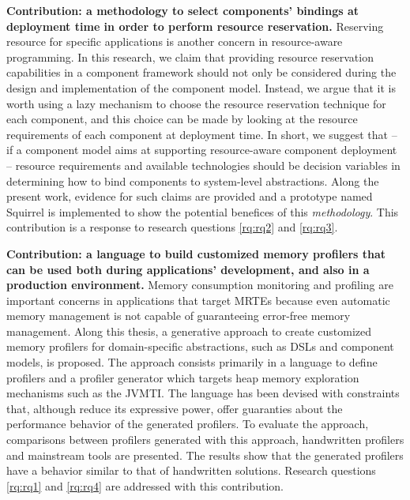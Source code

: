\textbf{Contribution: a methodology to select components' bindings at deployment time in order to perform resource reservation.}
Reserving resource for specific applications is another concern in resource-aware programming.
In this research, we claim that providing resource reservation capabilities in a component framework should not only be considered during the design and implementation of the component model.
Instead, we argue that it is worth using a lazy mechanism to choose the resource reservation technique for each component, and this choice can be made by looking at the resource requirements of each component at deployment time.
In short, we suggest that -- if a component model aims at supporting resource-aware component deployment -- resource requirements and available technologies should be decision variables in determining how to bind components to system-level abstractions.
Along the present work, evidence for such claims are provided and a prototype named Squirrel is implemented to show the potential benefices of this \textit{methodology}.
This contribution is a response to research questions \ref{rq:rq2} and \ref{rq:rq3}.

\textbf{Contribution: a language to build customized memory profilers that can be used both during applications' development, and also in a production environment.}
Memory consumption monitoring and profiling are important concerns in applications that target MRTEs because even automatic memory management is not capable of guaranteeing error-free memory management. %
Along this thesis, a generative approach to create customized memory profilers for domain-specific abstractions, such as DSLs and component models, is proposed.
The approach consists primarily in a language to define profilers and a profiler generator which targets heap memory exploration mechanisms such as the \gls{JVMTI}.
The language has been devised with constraints that, although reduce its expressive power, offer guaranties about the performance behavior of the generated profilers.
To evaluate the approach, comparisons between profilers generated with this approach, handwritten profilers and mainstream tools are presented.
The results show that the generated profilers have a behavior similar to that of handwritten solutions.
Research questions \ref{rq:rq1} and \ref{rq:rq4} are addressed with this contribution.
